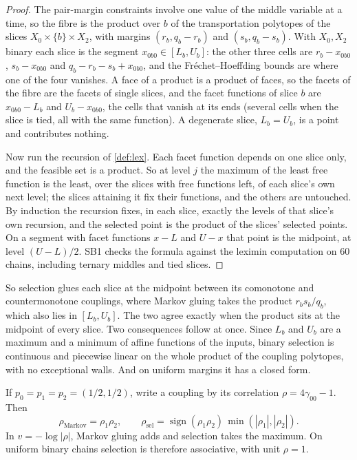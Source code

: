 \documentclass[11pt]{article}
\theoremstyle{definition}\newtheorem{definition}[theorem]{Definition}\newtheorem{remark}[theorem]{Remark}\newtheorem{example}[theorem]{Example}\newtheorem{problem}[theorem]{Open problem}\crefname{problem}{Problem}{Problems}
\begin{document}
\begin{proof}
The pair-margin constraints involve one value of the middle variable at a time, so the fibre is the product over $b$ of the transportation polytopes of the slices $X_0\times\{b\}\times X_2$, with
margins $(r_b,q_b-r_b)$ and $(s_b,q_b-s_b)$. With $X_0,X_2$ binary each slice is the segment $x_{0b0}\in[L_b,U_b]$: the other three cells are $r_b-x_{0b0}$, $s_b-x_{0b0}$ and $q_b-r_b-s_b+x_{0b0}$, and the
Fr\'echet--Hoeffding bounds are where one of the four vanishes. A face of a product is a product of faces, so the facets of the fibre are the facets of single slices, and the facet functions of slice $b$
are $x_{0b0}-L_b$ and $U_b-x_{0b0}$, the cells that vanish at its ends (several cells when the slice is tied, all with the same function). A degenerate slice, $L_b=U_b$, is a point and contributes nothing.

Now run the recursion of \cref{def:lex}. Each facet function depends on one slice only, and the feasible set is a product. So at level $j$ the maximum of the least free function is the least, over the
slices with free functions left, of each slice's own next level; the slices attaining it fix their functions, and the others are untouched. By induction the recursion fixes, in each slice, exactly the
levels of that slice's own recursion, and the selected point is the product of the slices' selected points. On a segment with facet functions $x-L$ and $U-x$ that point is the midpoint, at level
$(U-L)/2$. SB1 checks the formula against the leximin computation on $60$ chains, including ternary middles and tied slices.
\end{proof}

So selection glues each slice at the midpoint between its comonotone and countermonotone couplings, where Markov gluing takes the product $r_bs_b/q_b$, which also lies in $[L_b,U_b]$. The two agree exactly
when the product sits at the midpoint of every slice. Two consequences follow at once. Since $L_b$ and $U_b$ are a maximum and a minimum of affine functions of the inputs, binary selection is continuous and
piecewise linear on the whole product of the coupling polytopes, with no exceptional walls. And on uniform margins it has a closed form.

\begin{corollary}\label{cor:tropcorr}
If $p_0=p_1=p_2=(1/2,1/2)$, write a coupling by its correlation $\rho=4\gamma_{00}-1$. Then
\[
\rho_{\mathrm{Markov}}=\rho_1\rho_2,\qquad \rho_{\mathrm{sel}}=\operatorname{sign}(\rho_1\rho_2)\,\min(|\rho_1|,|\rho_2|).
\]
In $v=-\log|\rho|$, Markov gluing adds and selection takes the maximum. On uniform binary chains selection is therefore associative, with unit $\rho=1$.
\end{corollary}
\end{document}
